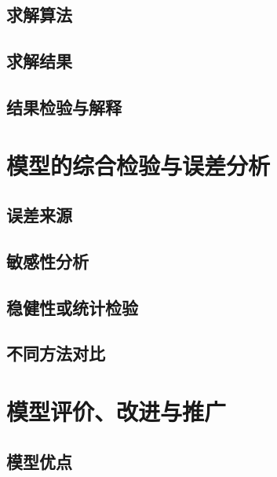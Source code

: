 \documentclass[withoutpreface,bwprint]{cumcmthesis}
\begin{document}
\subsection{求解算法}
\vspace{0.10\textheight}

\subsection{求解结果}
\vspace{0.12\textheight}

\subsection{结果检验与解释}
\vspace{0.10\textheight}

\clearpage
\section{模型的综合检验与误差分析}

\subsection{误差来源}
\vspace{0.08\textheight}

\subsection{敏感性分析}
\vspace{0.08\textheight}

\subsection{稳健性或统计检验}
\vspace{0.08\textheight}

\subsection{不同方法对比}
\vspace{0.08\textheight}

\clearpage
\section{模型评价、改进与推广}

\subsection{模型优点}
\vspace{0.06\textheight}
\end{document}
